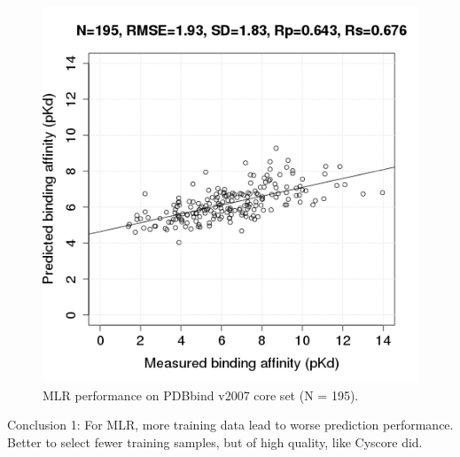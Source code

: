 \documentclass[journal=jacsat,manuscript=article]{achemso}
\begin{document}
\begin{figure}
\endminipage\hfill
{}%
\includegraphics[width=1.4\linewidth,natwidth=480,natheight=480]{../rfcyscore/x4/mlr/trn-2280-tst-195-yp.png}
\endminipage
\caption{MLR performance on PDBbind v2007 core set (N = 195).}
\label{fig:mlr-tst-195}
\end{figure}

Conclusion 1: For MLR, more training data lead to worse prediction performance. Better to select fewer training samples, but of high quality, like Cyscore did.
\end{document}
